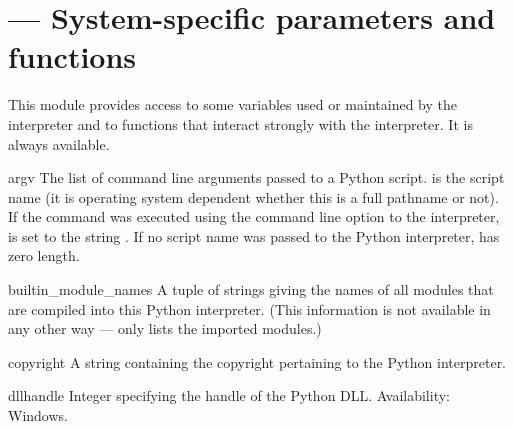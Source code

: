 \section{ ---
         System-specific parameters and functions}


This module provides access to some variables used or maintained by the
interpreter and to functions that interact strongly with the interpreter.
It is always available.


\begin{datadesc}{argv}
  The list of command line arguments passed to a Python script.
   is the script name (it is operating system
  dependent whether this is a full pathname or not).
  If the command was executed using the  command line
  option to the interpreter,  is set to the string
  .
  If no script name was passed to the Python interpreter,
   has zero length.
\end{datadesc}

\begin{datadesc}{builtin_module_names}
  A tuple of strings giving the names of all modules that are compiled
  into this Python interpreter.  (This information is not available in
  any other way ---  only lists the imported
  modules.)
\end{datadesc}

\begin{datadesc}{copyright}
A string containing the copyright pertaining to the Python interpreter.
\end{datadesc}

\begin{datadesc}{dllhandle}
Integer specifying the handle of the Python DLL.
Availability: Windows.
\end{datadesc}


